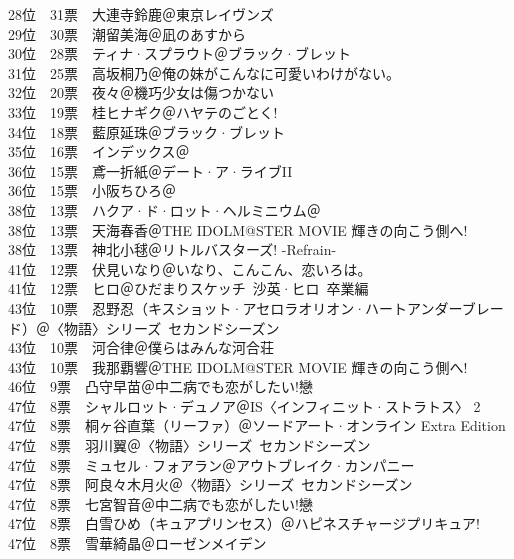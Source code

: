{    28位　31票　大連寺鈴鹿＠東京レイヴンズ\\
    29位　30票　潮留美海＠凪のあすから\\
    30位　28票　ティナ·スプラウト＠ブラック·ブレット\\
    31位　25票　高坂桐乃＠俺の妹がこんなに可愛いわけがない。\\
    32位　20票　夜々＠機巧少女は傷つかない\\
    33位　19票　桂ヒナギク＠ハヤテのごとく!\\
    34位　18票　藍原延珠＠ブラック·ブレット\\
    35位　16票　インデックス＠\Railgan\\
    36位　15票　鳶一折紙＠デート·ア·ライブII\\
    36位　15票　小阪ちひろ＠\Kaminomi\\
    38位　13票　ハクア·ド·ロット·ヘルミニウム＠\Kaminomi\\
    38位　13票　天海春香＠THE IDOLM@STER MOVIE 輝きの向こう側へ!\\
    38位　13票　神北小毬＠リトルバスターズ! -Refrain-\\
    41位　12票　伏見いなり＠いなり、こんこん、恋いろは。\\
    41位　12票　ヒロ＠ひだまりスケッチ~沙英·ヒロ~卒業編\\
    43位　10票　忍野忍（キスショット·アセロラオリオン·ハートアンダーブレード）＠〈物語〉シリーズ~セカンドシーズン\\
    43位　10票　河合律＠僕らはみんな河合荘\\
    43位　10票　我那覇響＠THE IDOLM@STER MOVIE 輝きの向こう側へ!\\
    46位　9票　凸守早苗＠中二病でも恋がしたい!戀\\
    47位　8票　シャルロット·デュノア＠IS〈インフィニット·ストラトス〉 2\\
    47位　8票　桐ヶ谷直葉（リーファ）＠ソードアート·オンライン Extra Edition\\
    47位　8票　羽川翼＠〈物語〉シリーズ~セカンドシーズン\\
    47位　8票　ミュセル·フォアラン＠アウトブレイク·カンパニー\\
    47位　8票　阿良々木月火＠〈物語〉シリーズ~セカンドシーズン\\
    47位　8票　七宮智音＠中二病でも恋がしたい!戀\\
    47位　8票　白雪ひめ（キュアプリンセス）＠ハピネスチャージプリキュア!\\
    47位　8票　雪華綺晶＠ローゼンメイデン\\
}
